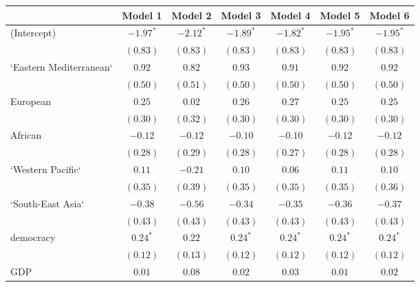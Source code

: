 
\begin{table}[!h]
\begin{center}
\begin{tabular}{l c c c c c c }
\toprule
 & Model 1 & Model 2 & Model 3 & Model 4 & Model 5 & Model 6 \\
\midrule
(Intercept)             & $-1.97^{*}$  & $-2.12^{*}$  & $-1.89^{*}$  & $-1.82^{*}$  & $-1.95^{*}$  & $-1.95^{*}$  \\
                        & $(0.83)$     & $(0.83)$     & $(0.83)$     & $(0.83)$     & $(0.83)$     & $(0.83)$     \\
`Eastern Mediterranean` & $0.92$       & $0.82$       & $0.93$       & $0.91$       & $0.92$       & $0.92$       \\
                        & $(0.50)$     & $(0.51)$     & $(0.50)$     & $(0.50)$     & $(0.50)$     & $(0.50)$     \\
European                & $0.25$       & $0.02$       & $0.26$       & $0.27$       & $0.25$       & $0.25$       \\
                        & $(0.30)$     & $(0.32)$     & $(0.30)$     & $(0.30)$     & $(0.30)$     & $(0.30)$     \\
African                 & $-0.12$      & $-0.12$      & $-0.10$      & $-0.10$      & $-0.12$      & $-0.12$      \\
                        & $(0.28)$     & $(0.29)$     & $(0.28)$     & $(0.27)$     & $(0.28)$     & $(0.28)$     \\
`Western Pacific`       & $0.11$       & $-0.21$      & $0.10$       & $0.06$       & $0.11$       & $0.10$       \\
                        & $(0.35)$     & $(0.39)$     & $(0.35)$     & $(0.35)$     & $(0.35)$     & $(0.36)$     \\
`South-East Asia`       & $-0.38$      & $-0.56$      & $-0.34$      & $-0.35$      & $-0.36$      & $-0.37$      \\
                        & $(0.43)$     & $(0.43)$     & $(0.43)$     & $(0.43)$     & $(0.43)$     & $(0.43)$     \\
democracy               & $0.24^{*}$   & $0.22$       & $0.24^{*}$   & $0.24^{*}$   & $0.24^{*}$   & $0.24^{*}$   \\
                        & $(0.12)$     & $(0.13)$     & $(0.12)$     & $(0.12)$     & $(0.12)$     & $(0.12)$     \\
GDP                     & $0.01$       & $0.08$       & $0.02$       & $0.03$       & $0.01$       & $0.02$       \\

\end{tabular}
\end{center}
\end{table}
